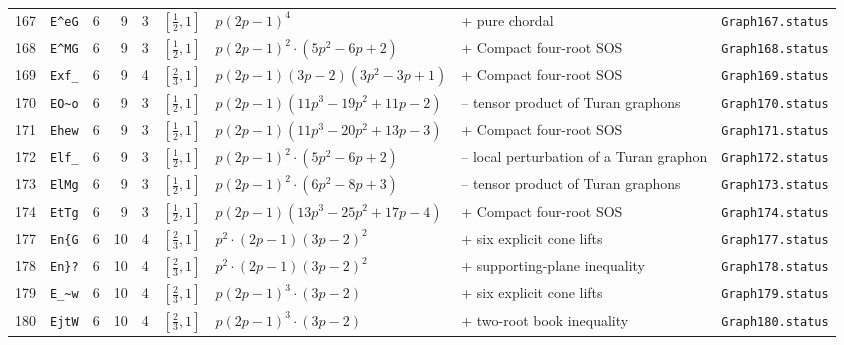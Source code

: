 \begin{landscape}
\begin{longtable}{r l r r r l p{4.0cm} p{3.5cm} p{2.7cm}}
167 & \texttt{E\textasciicircum{}eG} & 6 & 9 & 3 & $[\frac{1}{2},1]$ & $p \left(2 p - 1\right)^{4}$ & + pure chordal & \texttt{Graph167.status}\\
168 & \texttt{E\textasciicircum{}MG} & 6 & 9 & 3 & $[\frac{1}{2},1]$ & $p \left(2 p - 1\right)^{2} \cdot \left(5 p^{2} - 6 p + 2\right)$ & + Compact four-root SOS & \texttt{Graph168.status}\\
169 & \texttt{Exf\_} & 6 & 9 & 4 & $[\frac{2}{3},1]$ & $p \left(2 p - 1\right) \left(3 p - 2\right) \left(3 p^{2} - 3 p + 1\right)$ & + Compact four-root SOS & \texttt{Graph169.status}\\
170 & \texttt{EO\textasciitilde{}o} & 6 & 9 & 3 & $[\frac{1}{2},1]$ & $p \left(2 p - 1\right) \left(11 p^{3} - 19 p^{2} + 11 p - 2\right)$ & -- tensor product of Turan graphons & \texttt{Graph170.status}\\
171 & \texttt{Ehew} & 6 & 9 & 3 & $[\frac{1}{2},1]$ & $p \left(2 p - 1\right) \left(11 p^{3} - 20 p^{2} + 13 p - 3\right)$ & + Compact four-root SOS & \texttt{Graph171.status}\\
172 & \texttt{Elf\_} & 6 & 9 & 3 & $[\frac{1}{2},1]$ & $p \left(2 p - 1\right)^{2} \cdot \left(5 p^{2} - 6 p + 2\right)$ & -- local perturbation of a Turan graphon & \texttt{Graph172.status}\\
173 & \texttt{ElMg} & 6 & 9 & 3 & $[\frac{1}{2},1]$ & $p \left(2 p - 1\right)^{2} \cdot \left(6 p^{2} - 8 p + 3\right)$ & -- tensor product of Turan graphons & \texttt{Graph173.status}\\
174 & \texttt{EtTg} & 6 & 9 & 3 & $[\frac{1}{2},1]$ & $p \left(2 p - 1\right) \left(13 p^{3} - 25 p^{2} + 17 p - 4\right)$ & + Compact four-root SOS & \texttt{Graph174.status}\\
177 & \texttt{En\{G} & 6 & 10 & 4 & $[\frac{2}{3},1]$ & $p^{2} \cdot \left(2 p - 1\right) \left(3 p - 2\right)^{2}$ & + six explicit cone lifts & \texttt{Graph177.status}\\
178 & \texttt{En\}?} & 6 & 10 & 4 & $[\frac{2}{3},1]$ & $p^{2} \cdot \left(2 p - 1\right) \left(3 p - 2\right)^{2}$ & + supporting-plane inequality & \texttt{Graph178.status}\\
179 & \texttt{E\_\textasciitilde{}w} & 6 & 10 & 4 & $[\frac{2}{3},1]$ & $p \left(2 p - 1\right)^{3} \cdot \left(3 p - 2\right)$ & + six explicit cone lifts & \texttt{Graph179.status}\\
180 & \texttt{EjtW} & 6 & 10 & 4 & $[\frac{2}{3},1]$ & $p \left(2 p - 1\right)^{3} \cdot \left(3 p - 2\right)$ & + two-root book inequality & \texttt{Graph180.status}\\

\end{longtable}
\end{landscape}
